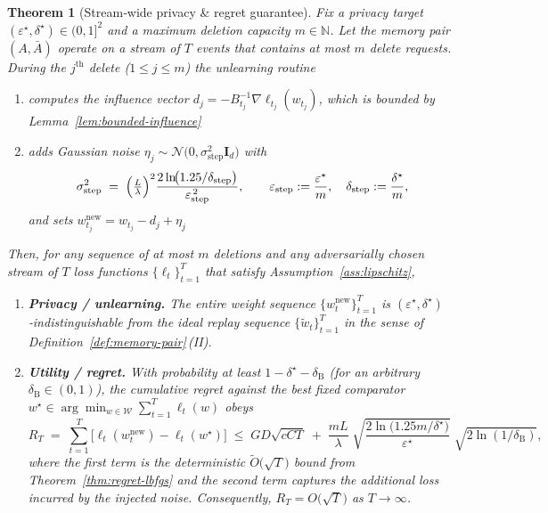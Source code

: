 \documentclass[a4paper,12pt]{article}
\newtheorem{theorem}{Theorem}
\begin{document}
\begin{theorem}[Stream‑wide privacy \& regret guarantee]
\label{thm:comp-privacy-regret}
Fix a privacy target $(\varepsilon^{\star},\delta^{\star})\in(0,1]^{2}$ and a maximum deletion capacity $m\in\mathbb{N}$. Let the memory pair $(A,\bar A)$ operate on a stream of $T$ events that contains at most $m$ delete requests. During the $j^{\text{th}}$ delete ($1\le j\le m$) the unlearning routine

\begin{enumerate}
    \item computes the influence vector $d_{j} = -B_{t_{j}}^{-1}\nabla \ell_{t_{j}}(w_{t_{j}})$, which is bounded by Lemma~\ref{lem:bounded-influence}
    \item adds Gaussian noise $\eta_j\sim\mathcal N\!\bigl(0,\sigma_{\text{step}}^2\mathbf I_d\bigr)$ with 
    \[
    \sigma_{\text{step}}^2
    \;=\;
    \Bigl(\tfrac{L}{\lambda}\Bigr)^2
    \frac{2\ln\!\bigl(1.25/\delta_{\text{step}}\bigr)}%
         {\varepsilon_{\text{step}}^{\,2}},
    \qquad
    \varepsilon_{\text{step}}:=\frac{\varepsilon^\star}{m},
    \quad
    \delta_{\text{step}}:=\frac{\delta^\star}{m},
  \]
    and sets $w_{t_j}^{\text{new}} = w_{t_j}-d_j+\eta_j$
\end{enumerate}

Then, for \emph{any} sequence of at most $m$ deletions and \emph{any}
adversarially chosen stream of $T$ loss functions
$\{\ell_t\}_{t=1}^{T}$ that satisfy Assumption~\ref{ass:lipschitz},

\begin{enumerate}
\item \textbf{Privacy / unlearning.}  
      The entire weight sequence $\{w_t^{\text{new}}\}_{t=1}^{T}$
      is $(\varepsilon^\star,\delta^\star)$‑indistinguishable
      from the ideal replay sequence
      $\{\tilde w_t\}_{t=1}^{T}$ in the sense of
      Definition~\ref{def:memory-pair}\,(II).

\item \textbf{Utility / regret.}  
      With probability at least
      $1-\delta^\star-\delta_{\mathrm{B}}$ (for an arbitrary
      $\delta_{\mathrm{B}}\!\in\!(0,1)$),
      the cumulative regret against the best fixed comparator
      $w^\star\in\arg\min_{w\in\mathcal W}\sum_{t=1}^{T}\ell_t(w)$ obeys
      \[
        R_T
        \;=\;
        \sum_{t=1}^{T}\bigl[\ell_t(w_t^{\text{new}})-\ell_t(w^\star)\bigr]
        \;\le\;
        GD\sqrt{cCT}
        \;+\;
        \frac{mL}{\lambda}\;
        \sqrt{\frac{2\ln\!\bigl(1.25m/\delta^\star\bigr)}%
                   {\varepsilon^\star}}\;
        \sqrt{2\ln(1/\delta_{\mathrm{B}})},
      \]
      where the first term is the deterministic
      $\tilde O\!\bigl(\sqrt{T}\bigr)$ bound from
      Theorem~\ref{thm:regret-lbfgs} and the second term captures the
      additional loss incurred by the injected noise.
      Consequently, $R_T = O\!\bigl(\sqrt{T}\bigr)$ as
      $T\!\to\!\infty$.
\end{enumerate}
\end{theorem}
\end{document}
